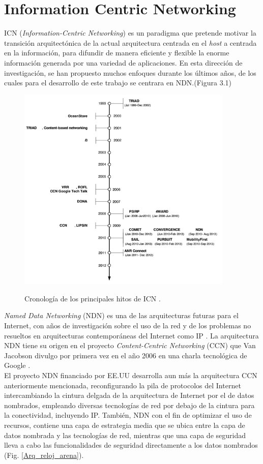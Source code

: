 \documentclass[12pt]{ociamthesis}  %
\begin{document}
\section{Information Centric Networking}
ICN (\textit{Information-Centric Networking}) es un paradigma que pretende motivar la transición arquitectónica de la actual arquitectura centrada en el \textit{host} a centrada en la información, para difundir de manera eficiente y flexible la enorme información generada por una variedad de aplicaciones. En esta dirección de investigación, se han propuesto muchos enfoques durante los últimos años, de los cuales para el desarrollo de este trabajo se centrara en NDN.(Figura 3.1)
	\begin{figure}[!htb]
		\centering
		\includegraphics[width=10.3cm]{Imagenes/Linea_Temporal_ICN_limpia.png}\\
		\caption{Cronología de los principales hitos de ICN \cite{xylomenos2014survey}.}
		\label{fig:mesh1}
	\end{figure}
\textit{Named Data Networking} (NDN) es una de las arquitecturas futuras para el Internet, con años de investigación sobre el uso de la red y de los problemas no resueltos en arquitecturas contemporáneas del Internet como IP \cite{nsf10528}\cite{nsf13538}. La arquitectura NDN tiene su origen en el proyecto \textit{Content-Centric Networking} (CCN) que Van Jacobson divulgo por primera vez en el año 2006 en una charla tecnológica de Google \cite{jacobson2006new}.\\

El proyecto NDN financiado por EE.UU desarrolla aun más la arquitectura CCN anteriormente mencionada, reconfigurando la pila de protocolos del Internet intercambiando la cintura delgada de la arquitectura de Internet por el de datos nombrados, empleando diversas tecnologías de red por debajo de la cintura para la conectividad, incluyendo IP. También, NDN con el fin de optimizar el uso de recursos, contiene una capa de estrategia media que se ubica entre la capa de datos nombrada y las tecnologías de red, mientras que una capa de seguridad lleva a cabo las funcionalidades de seguridad directamente a los datos nombrados \cite{xylomenos2014survey}(Fig. \ref{Arq_reloj_arena}).\\
\end{document}
